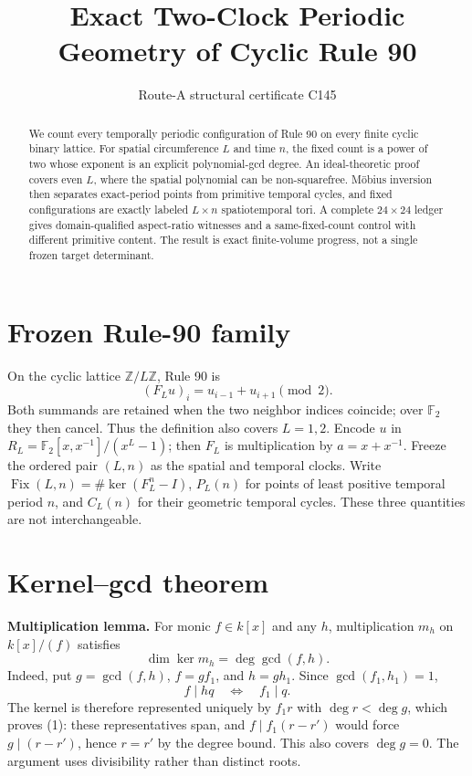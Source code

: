 \documentclass[10pt]{article}
\title{Exact Two-Clock Periodic Geometry of Cyclic Rule 90}
\author{Route-A structural certificate C145}
\date{}
\begin{document}
\maketitle

\begin{abstract}
We count every temporally periodic configuration of Rule 90 on every finite
cyclic binary lattice.  For spatial circumference $L$ and time $n$, the fixed
count is a power of two whose exponent is an explicit polynomial-gcd degree.
An ideal-theoretic proof covers even $L$, where the spatial polynomial can be
non-squarefree.  M\"obius inversion then separates exact-period points from
primitive temporal cycles, and fixed configurations are exactly labeled
$L\times n$ spatiotemporal tori.  A complete $24\times24$ ledger gives
domain-qualified aspect-ratio witnesses and a same-fixed-count control with
different primitive content.  The result is exact finite-volume progress, not
a single frozen target determinant.
\end{abstract}

\section{Frozen Rule-90 family}
On the cyclic lattice $\mathbb Z/L\mathbb Z$, Rule 90 is
\[
(F_Lu)_i=u_{i-1}+u_{i+1}\pmod2.
\]
Both summands are retained when the two neighbor indices coincide; over
$\mathbb F_2$ they then cancel.  Thus the definition also covers $L=1,2$.
Encode $u$ in
$R_L=\mathbb F_2[x,x^{-1}]/(x^L-1)$; then $F_L$ is multiplication by
$a=x+x^{-1}$.  Freeze the ordered pair $(L,n)$ as the spatial and temporal
clocks.  Write $\operatorname{Fix}(L,n)=\#\ker(F_L^n-I)$,
$P_L(n)$ for points of least positive temporal period $n$, and $C_L(n)$ for
their geometric temporal cycles.  These three quantities are not
interchangeable.

\section{Kernel--gcd theorem}
\textbf{Multiplication lemma.}  For monic $f\in k[x]$ and any $h$, multiplication
$m_h$ on $k[x]/(f)$ satisfies
\begin{equation}
\dim\ker m_h=\deg\gcd(f,h).                                      \tag{1}
\end{equation}
Indeed, put $g=\gcd(f,h)$, $f=gf_1$, and $h=gh_1$.  Since
$\gcd(f_1,h_1)=1$,
\[
f\mid hq\quad\Longleftrightarrow\quad f_1\mid q.
\]
The kernel is therefore represented uniquely by $f_1r$ with $\deg r<\deg g$,
which proves (1): these representatives span, and
$f\mid f_1(r-r')$ would force $g\mid(r-r')$, hence $r=r'$ by the degree
bound.  This also covers $\deg g=0$.  The argument uses divisibility rather
than distinct roots.
\end{document}
